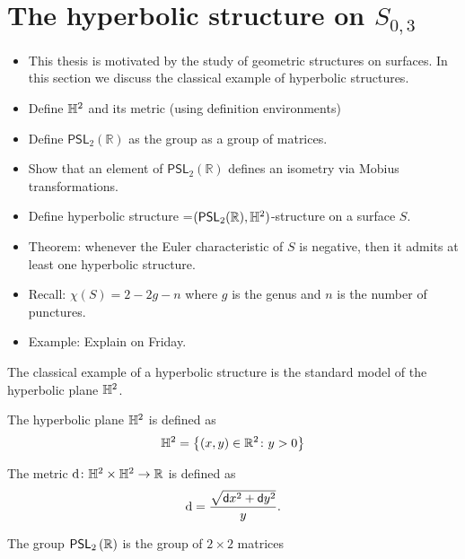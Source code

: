 \documentclass{amsart}
\begin{document}
	\section{The hyperbolic structure on $S_{0,3}$}
	\label{sec:hyperbolic_structure}
	\begin{tcolorbox}
		\begin{itemize}
			\item This thesis is motivated by the study of geometric structures on surfaces. In this section we discuss the classical example of hyperbolic structures.
			\item Define $\mathbb{H}^2$ and its metric (using definition environments)
			\item Define $\mathsf{PSL}_2(\mathbb R)$ as the group as a group of matrices.
			\item Show that an element of $\mathsf{PSL}_2(\mathbb R)$ defines an isometry via Mobius transformations. 
			\item Define hyperbolic structure =$(\mathsf{PSL}_2(\mathbb R),\mathbb{H}^2)$-structure on a surface $S$.
			\item Theorem: whenever the Euler characteristic of $S$ is negative, then it admits at least one hyperbolic structure.
			\item Recall: $\chi(S)=2-2g-n$ where $g$ is the genus and $n$ is the number of punctures.
			\item Example: Explain on Friday.
		\end{itemize}
	\end{tcolorbox}
	
	The classical example of a hyperbolic structure is the standard model of the hyperbolic plane $\mathbb{H}^2$.
	\begin{definition}
		\label{def:H2_set}
		The hyperbolic plane $\mathbb{H}^2$ is defined as
		\begin{equation*}
			\mathbb{H}^2 = \left\{ (x,y) \in \mathbb{R}^2 \colon y > 0\right\}
		\end{equation*}
	\end{definition}
	
	\begin{definition}
		\label{def:H2_metric}
		The metric $\operatorname{d} \colon \mathbb{H}^2 \times \mathbb{H}^2 \to \mathbb{R}$ is defined as
		\begin{equation*}
			\operatorname{d} = \frac{\sqrt{\mathsf{d} x^2 + \mathsf{d} y^2}}{y}.
		\end{equation*}
		
		\begin{definition}
			The group $\mathsf{PSL}_{2}\left(\mathbb{R}\right)$ is the group of $2\times2$ matrices
		\end{definition}
	\end{definition}
	
\end{document}

